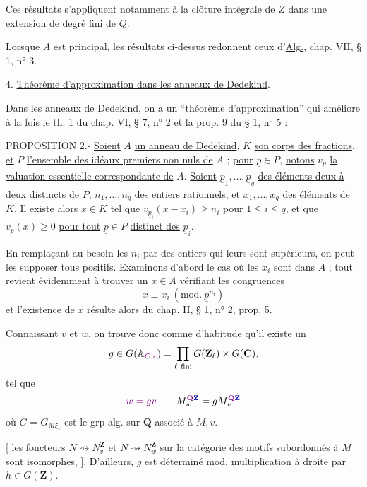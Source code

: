 Ces résultats s'appliquent notamment à la clôture intégrale de $Z$ dans une extension de degré fini de $Q$.

Lorsque $A$ est principal, les résultats ci-dessus redonnent ceux d'\uline{Alg.}, chap. VII, § 1, n° 3.

4. \uline{Théorème d'approximation dans les anneaux de Dedekind}.

Dans les anneaux de Dedekind, on a un ``théorème d'approximation'' qui améliore à la fois le th. 1 du chap. VI, § 7, n° 2 et la prop. 9 du § 1, n° 5 :

PROPOSITION 2.- \uline{Soient} $A$ \uline{un anneau de Dedekind}, $K$ \uline{son corps des fractions}, \uline{et} $P$ \uline{l'ensemble des idéaux premiers non nuls de} $A$ ; \uline{pour} $\underline p\in P$, \uline{notons} $v_{\underline p}$ \uline{la valuation essentielle correspondante de} $A$. \uline{Soient} $\underline p_1,\ldots,\underline p_q$ \uline{des éléments deux à deux distincts de} $P$, $n_1,\ldots,n_q$ \uline{des entiers rationnels}, \uline{et} $x_1,\ldots,x_q$ \uline{des éléments de} $K$. \uline{Il existe alors} $x\in K$ \uline{tel que} $v_{\underline p_i}(x-x_i)\ge n_i$ \uline{pour} $1\le i\le q$, \uline{et que} $v_{\underline p}(x)\ge0$ \uline{pour tout} $\underline p\in P$ \uline{distinct des} $\underline p_i$.

En remplaçant au besoin les $n_i$ par des entiers qui leurs sont supérieurs, on peut les supposer tous positifs. Examinons d'abord le cas où les $x_i$ sont dans $A$ ; tout revient évidemment à trouver un $x\in A$ vérifiant les congruences
\[
x\equiv x_i\ (\mathrm{mod.}\ \underline p^{n_i})
\]
et l'existence de $x$ résulte alors du chap. II, § 1, n° 2, prop. 5.

Connaissant $v$ et $w$, on trouve donc  comme d'habitude qu'il existe un
\[
g\in G(\mathbb A_{\unsure{C|c}})=\prod_{\ell\ \mathrm{fini}}G(\mathbf Z_\ell)\times G(\mathbf C),
\]
tel que
\[
\deleted{\unsure{w=gv}}
\qquad M_w^{\deleted{\unsure{\mathbf Q}}\inserted{\mathbf Z}}=gM_v^{\deleted{\unsure{\mathbf Q}}\inserted{\mathbf Z}}
\]
où $G=G_{M\xi_v}$ est le grp alg. sur $\mathbf Q$ associé à $M,v$.

[  les foncteurs $N\rightsquigarrow N_v^{\mathbf Z}$ et $N\rightsquigarrow N_w^{\mathbf Z}$ sur la catégorie des \uline{motifs} \uline{subordonnés} à $M$ sont isomorphes, ]. D'ailleurs, $g$ est déterminé mod. multiplication à droite par $h\in G(\mathbf Z)$.


